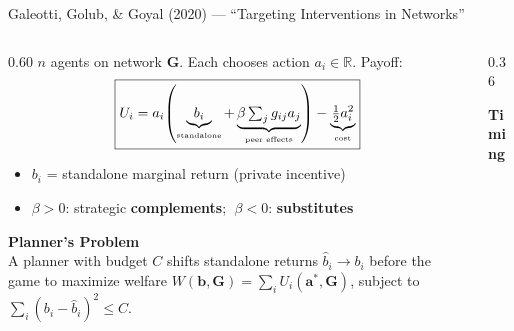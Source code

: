 \documentclass[aspectratio=169]{beamer}
\newcommand{\accentline}{\vspace{1pt}{\color{accent}\rule{0.3\textwidth}{1.5pt}}\vspace{4pt}}
\begin{document}
\begin{frame}[shrink=5]{Galeotti, Golub, \& Goyal (2020) --- ``Targeting Interventions in Networks''}
\accentline
\begin{columns}[T]
    \begin{column}{0.60\textwidth}
        {\small $n$ agents on network $\mathbf{G}$. Each chooses action $a_i \in \mathbb{R}$. Payoff:}
        \vspace{-2pt}
        \[
            \boxed{U_i = a_i\!\left(\underbrace{b_i}_{\text{\tiny standalone}} + \underbrace{\beta \textstyle\sum_j g_{ij} a_j}_{\text{\tiny peer effects}}\right) - \underbrace{\tfrac{1}{2}a_i^2}_{\text{\tiny cost}}}
        \]
        \vspace{-6pt}
        \begin{itemize}\small\setlength\itemsep{2pt}
            \item $b_i$ = standalone marginal return (private incentive)
            \item $\beta > 0$: strategic \textbf{complements}; $\;\beta < 0$: \textbf{substitutes}
        \end{itemize}

        \vspace{4pt}
        {\color{accentgreen}\bfseries Planner's Problem}\\[2pt]
        {\small A planner with budget $C$ shifts standalone returns $\hat{b}_i \to b_i$ before the game to maximize welfare $W(\mathbf{b},\mathbf{G}) = \sum_i U_i(\mathbf{a}^*,\mathbf{G})$, subject to $\sum_i(b_i - \hat{b}_i)^2 \leq C$.}
    \end{column}
    \begin{column}{0.36\textwidth}
        \vspace{-15pt}
        \begin{center}
        {\small\color{accentgreen}\bfseries Timing}\\[1pt]
        \end{center}


\end{column}
\end{columns}
\end{frame}
\end{document}
